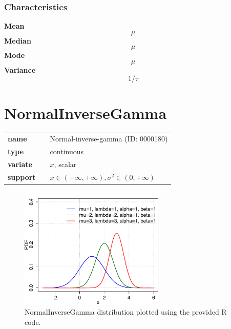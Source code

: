 \subsubsection*{Characteristics}
\smallskip \noindent \hspace{.2cm} \textbf{Mean} 
\begin{equation*}\mu\end{equation*}
\smallskip \noindent \hspace{.2cm} \textbf{Median} 
\begin{equation*}\mu\end{equation*}
\smallskip \noindent \hspace{.2cm} \textbf{Mode} 
\begin{equation*}\mu\end{equation*}
\smallskip \noindent \hspace{.2cm} \textbf{Variance} 
\begin{equation*}1/\tau\end{equation*}
\smallskip
\section*{NormalInverseGamma} 

  \bigskip 

\begin{tabular}{p{2cm}cl}
\textbf{name} & & Normal-inverse-gamma (ID: 0000180)\\ 
 
\textbf{type} & & continuous \\ 

\textbf{variate} & & $x$, scalar \\ 

\textbf{support} & & $x \in (-\infty,+\infty), \sigma^2 \in (0,+\infty)$
\end{tabular}

\begin{figure}[ht!]
\centering
  \includegraphics[width=70mm]{pics/NormalInverseGamma.pdf}
 \caption{NormalInverseGamma distribution plotted using the provided R code.}
 \label{fig:NormalInverseGamma}
\end{figure}

